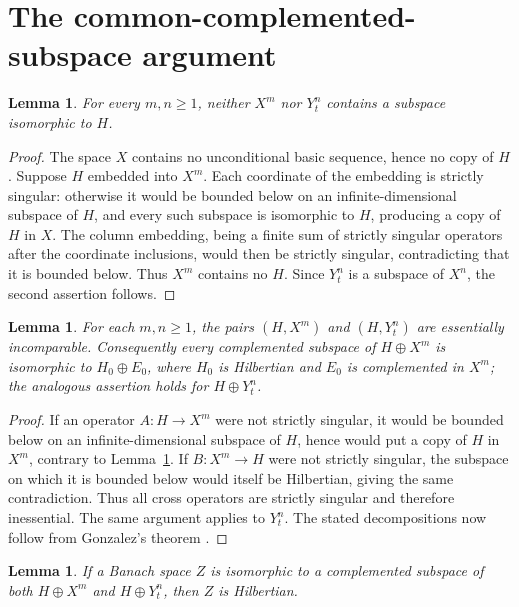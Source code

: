 \documentclass[11pt]{article}
\newtheorem{lemma}[theorem]{Lemma}
\begin{document}
\section{The common-complemented-subspace argument}

\begin{lemma}\label{lem:nohilbert}
For every $m,n\geq1$, neither $X^m$ nor $Y_t^n$ contains a subspace
isomorphic to $H$.
\end{lemma}

\begin{proof}
The space $X$ contains no unconditional basic sequence, hence no copy of
$H$. Suppose $H$ embedded into $X^m$. Each coordinate of the embedding is
strictly singular: otherwise it would be bounded below on an
infinite-dimensional subspace of $H$, and every such subspace is isomorphic
to $H$, producing a copy of $H$ in $X$. The column embedding, being a finite
sum of strictly singular operators after the coordinate inclusions, would
then be strictly singular, contradicting that it is bounded below. Thus
$X^m$ contains no $H$. Since $Y_t^n$ is a subspace of $X^n$, the second
assertion follows.
\end{proof}

\begin{lemma}\label{lem:decompose}
For each $m,n\geq1$, the pairs $(H,X^m)$ and $(H,Y_t^n)$ are essentially
incomparable. Consequently every complemented subspace of $H\oplus X^m$ is
isomorphic to $H_0\oplus E_0$, where $H_0$ is Hilbertian and $E_0$ is
complemented in $X^m$; the analogous assertion holds for $H\oplus Y_t^n$.
\end{lemma}

\begin{proof}
If an operator $A:H\to X^m$ were not strictly singular, it would be bounded
below on an infinite-dimensional subspace of $H$, hence would put a copy of
$H$ in $X^m$, contrary to Lemma~\ref{lem:nohilbert}. If
$B:X^m\to H$ were not strictly singular, the subspace on which it is bounded
below would itself be Hilbertian, giving the same contradiction. Thus all
cross operators are strictly singular and therefore inessential. The same
argument applies to $Y_t^n$. The stated decompositions now follow from
Gonzalez's theorem \cite{Gonzalez}.
\end{proof}

\begin{lemma}\label{lem:common}
If a Banach space $Z$ is isomorphic to a complemented subspace of both
$H\oplus X^m$ and $H\oplus Y_t^n$, then $Z$ is Hilbertian.
\end{lemma}
\end{document}
